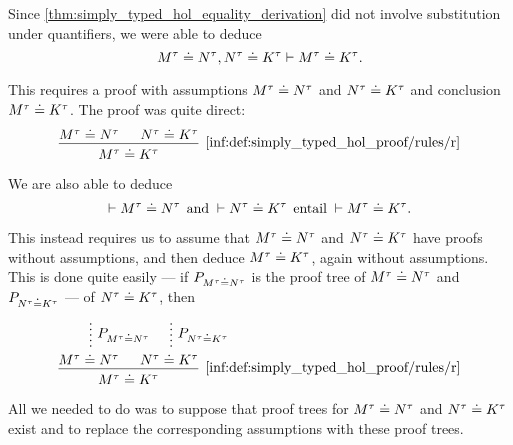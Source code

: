 \begin{remark}\label{rem:simply_typed_hol_syntactic_metalogical_consequence}
  Since \cref{thm:simply_typed_hol_equality_derivation} did not involve substitution under quantifiers, we were able to deduce
  \begin{equation*}
    M^\tau \doteq N^\tau, N^\tau \doteq K^\tau \vdash M^\tau \doteq K^\tau.
  \end{equation*}

  This requires a proof with assumptions \( M^\tau \doteq N^\tau \) and \( N^\tau \doteq K^\tau \) and conclusion \( M^\tau \doteq K^\tau \). The proof was quite direct:
  \begin{equation*}
    \begin{prooftree}
      \hypo{ M^\tau \syneq N^\tau }
      \hypo{ N^\tau \syneq K^\tau }
      \infer2[\ref{inf:def:simply_typed_hol_proof/rules/r}]{ M^\tau \syneq K^\tau }
    \end{prooftree}
  \end{equation*}

  We are also able to deduce
  \begin{equation*}
    \vdash M^\tau \syneq N^\tau \thinspace \T{and} {}\vdash N^\tau \syneq K^\tau \thinspace \T{entail} {}\vdash M^\tau \syneq K^\tau.
  \end{equation*}

  This instead requires us to assume that \( M^\tau \doteq N^\tau \) and \( N^\tau \doteq K^\tau \) have proofs without assumptions, and then deduce \( M^\tau \doteq K^\tau \), again without assumptions. This is done quite easily --- if \( P_{M^\tau \doteq N^\tau} \) is the proof tree of \( M^\tau \doteq N^\tau \) and \( P_{N^\tau \doteq K^\tau} \) --- of \( N^\tau \doteq K^\tau \), then
  \begin{equation*}
    \begin{prooftree}
      \hypo{}
      \ellipsis { \( P_{M^\tau \syneq N^\tau} \) } { M^\tau \syneq N^\tau }

      \hypo{}
      \ellipsis { \( P_{N^\tau \syneq K^\tau} \) } { N^\tau \syneq K^\tau }

      \infer2[\ref{inf:def:simply_typed_hol_proof/rules/r}]{ M^\tau \syneq K^\tau }
    \end{prooftree}
  \end{equation*}

  All we needed to do was to suppose that proof trees for \( M^\tau \doteq N^\tau \) and \( N^\tau \doteq K^\tau \) exist and to replace the corresponding assumptions with these proof trees.


\end{remark}
